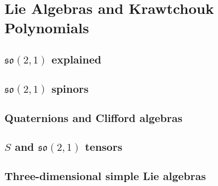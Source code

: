 \chapter{Lie Algebras and Krawtchouk Polynomials}
\label{ch:6}
\section{$\mathfrak{so}(2,1)$ explained}
\label{sec:6-1}

\section{$\mathfrak{so}(2,1)$ spinors}
\label{sec:6-2}

\section{Quaternions and Clifford algebras}
\label{sec:6-3}

\section{$S$ and $\mathfrak{so}(2,1)$ tensors}
\label{sec:6-4}

\section{Three-dimensional simple Lie algebras}
\label{sec:6-5}

